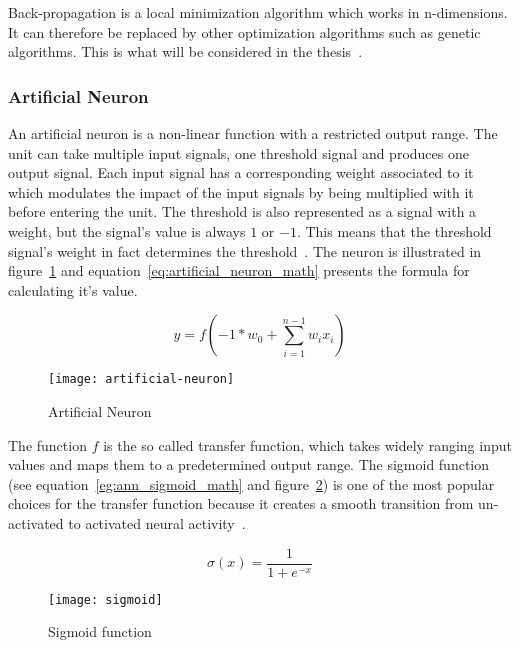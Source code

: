 Back-propagation is a local minimization algorithm which works in n-dimensions. It can therefore be replaced by other optimization algorithms such as genetic algorithms. This is what will be considered in the thesis~\cite{gardner1998artificial}.

\subsubsection{Artificial Neuron}

An artificial neuron is a non-linear function with a restricted output range. The unit can take multiple input signals, one threshold signal and produces one output signal. Each input signal has a corresponding weight associated to it which modulates the impact of the input signals by being multiplied with it before entering the unit. The threshold is also represented as a signal with a weight, but the signal's value is always $1$ or $-1$. This means that the threshold signal's weight in fact determines the threshold~\cite{koehn1994combining}. The neuron is illustrated in figure~\ref{figure:artificial_neuron} and equation~\ref{eq:artificial_neuron_math} presents the formula for calculating it's value.

\begin{equation} \label{eq:artificial_neuron_math}
  y = f(-1*w_0+\sum_{i=1}^{n-1}{w_ix_i})
\end{equation}

\begin{figure}[H]
  \centering
    \texttt{[image: artificial-neuron]}
    \caption{Artificial Neuron}
    \label{figure:artificial_neuron}
\end{figure}

The function $f$ is the so called transfer function, which takes widely ranging input values and maps them to a predetermined output range. The sigmoid function (see equation~\ref{eg:ann_sigmoid_math} and figure~\ref{figure:ann_sigmoid}) is one of the most popular choices for the transfer function because it creates a smooth transition from un-activated to activated neural activity~\cite{koehn1994combining}.

\begin{equation} \label{eg:ann_sigmoid_math}
  \sigma(x)=\frac{1}{1+e^{-x}}
\end{equation}

\begin{figure}[H]
  \centering
    \texttt{[image: sigmoid]}
    \caption{Sigmoid function}
    \label{figure:ann_sigmoid}
\end{figure}

